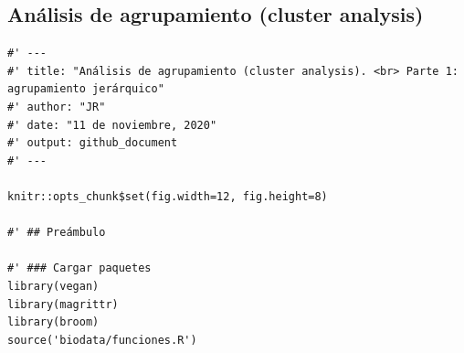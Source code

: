 \documentclass[11pt,]{article}
\begin{document}
\subsection{Análisis de agrupamiento (cluster
analysis)}\label{anuxe1lisis-de-agrupamiento-cluster-analysis}

\begin{verbatim}
#' ---
#' title: "Análisis de agrupamiento (cluster analysis). <br> Parte 1: agrupamiento jerárquico"
#' author: "JR"
#' date: "11 de noviembre, 2020"
#' output: github_document
#' ---

knitr::opts_chunk$set(fig.width=12, fig.height=8)

#' ## Preámbulo

#' ### Cargar paquetes
library(vegan)
library(magrittr)
library(broom)
source('biodata/funciones.R')


\end{verbatim}
\end{document}
